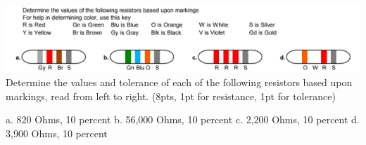 \documentclass[10pt]{examdesign}
\begin{document}
\begin{shortanswer}[title={Short Answer},rearrange=no,resetcounter=no]
\begin{question}
        \includegraphics[width=15cm]{circuit7.png}
        \\Determine the values and tolerance of each of the following resistors based upon markings, read from left to right. (8pts, 1pt for resistance, 1pt for tolerance)
        \begin{answer}
        a. 820 Ohms, 10 percent
        b. 56,000 Ohms, 10 percent
        c. 2,200 Ohms, 10 percent
        d. 3,900 Ohms, 10 percent
        \end{answer}
        \end{question}
    \end{shortanswer}
	\pagebreak
\end{document}
